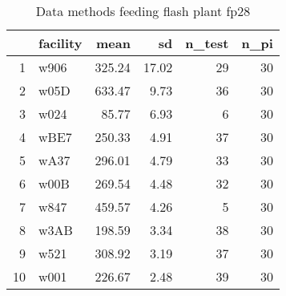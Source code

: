 \begin{table}[H]
\centering
\begin{tabular}{rlrrrr}
  \hline
 & facility & mean & sd & n\_test & n\_pi \\ 
  \hline
1 & w906 & 325.24 & 17.02 &  29 &  30 \\ 
  2 & w05D & 633.47 & 9.73 &  36 &  30 \\ 
  3 & w024 & 85.77 & 6.93 &   6 &  30 \\ 
  4 & wBE7 & 250.33 & 4.91 &  37 &  30 \\ 
  5 & wA37 & 296.01 & 4.79 &  33 &  30 \\ 
  6 & w00B & 269.54 & 4.48 &  32 &  30 \\ 
  7 & w847 & 459.57 & 4.26 &   5 &  30 \\ 
  8 & w3AB & 198.59 & 3.34 &  38 &  30 \\ 
  9 & w521 & 308.92 & 3.19 &  37 &  30 \\ 
  10 & w001 & 226.67 & 2.48 &  39 &  30 \\ 
   \hline
\end{tabular}
\caption{Data methods feeding flash plant fp28} 
\label{tab:well_summaries_fp16}
\end{table}
